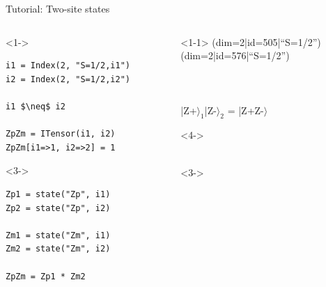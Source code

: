 \begin{frame}[fragile]{Tutorial: Two-site states}

\begin{columns}

\begin{column}{4.5cm}

\begin{onlyenv}<1->
\begin{lstlisting}[language=JuliaLocal, style=julia, mathescape, basicstyle=\scriptsize\ttfamily]
i1 = Index(2, "S=1/2,i1")
i2 = Index(2, "S=1/2,i2")

i1 $\neq$ i2

ZpZm = ITensor(i1, i2)
ZpZm[i1=>1, i2=>2] = 1
\end{lstlisting}
\end{onlyenv}

\begin{onlyenv}<3->
\begin{lstlisting}[language=JuliaLocal, style=julia, basicstyle=\scriptsize\ttfamily]
Zp1 = state("Zp", i1)
Zp2 = state("Zp", i2)

Zm1 = state("Zm", i1)
Zm2 = state("Zm", i2)

ZpZm = Zp1 * Zm2
\end{lstlisting}
\end{onlyenv}

\end{column}

\begin{column}{5cm}

\begin{onlyenv}<1-1>
(dim=2|id=505|``S=1/2'') \\
(dim=2|id=576|``S=1/2'') \\
~\\
~\\
~\\
|Z+$\rangle_1$|Z-$\rangle_2$ = |Z+Z-$\rangle$ \\
\end{onlyenv}

\begin{onlyenv}<4->
~\\
~\\
\end{onlyenv}

\begin{onlyenv}<3->
~\\
\end{onlyenv}


\end{column}
\end{columns}
\end{frame}
